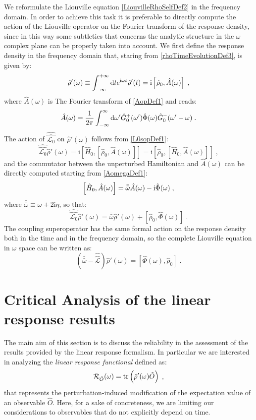 \documentclass[a4paper]{article}
\newcommand{\dd}{{\rm d}}
\newcommand{\bbomega}{{\bar{\bar\omega}}}
\newcommand{\ii}{\mathrm{i}}
\newcommand{\intover}[1]{\int_{-\infty}^{+\infty} \dd {#1}}
\newcommand{\be}{\begin{equation}}
\newcommand{\ee}{\end{equation}}
\newcommand{\nn}{\notag}
\newcommand{\lb}{\label}
\newcommand{\op}[1]{\hat {#1}}
\newcommand{\sop}[1]{\op{\op {#1}}}
\newcommand{\commutator}[2]{\left[ {#1} , {#2} \right]}
\newcommand{\trace}[1]{\mathrm{tr}\left(#1\right)}
\newcommand{\dmnot}{\op{\rho}_0}
\newcommand{\dm}{\op{\rho}}
\newcommand{\hnot}{\op{H}_0}
\newcommand{\Liouv}{\sop{\mathcal L}}
\newcommand{\Liouvnot}{\sop{\mathcal L_0}}
\begin{document}
We reformulate the Liouville equation \eqref{LiouvilleRhoSelfDef2} in the frequency domain. In order to achieve this task it is
preferable to directly compute the action of the Liouville operator on the Fourier transform of the response density, since in this
way some subtleties that concerns the analytic structure in the $\omega$ complex plane can be properly taken into account.
We first define the response density in the frequency domain that, staring from \eqref{rhoTimeEvolutionDef3}, is given by:
\be\lb{rhoPrimeOmegaDef1}
\dm'(\omega) \equiv \intover{t} e^{\ii \omega t} \dm'(t)
= \ii \commutator{\dmnot}{\op A(\omega)} \;,
\ee
where $\op A(\omega)$ is The Fourier transform of \eqref{AopDef1} and reads:
\be \lb{AomegaDef1}
\op A(\omega) = \frac{1}{2\pi} \int_{-\infty}^\infty  \dd \omega'
\op G_0^+(\omega') \op \Phi(\omega) \op G_0^-(\omega'-\omega)\;.
\ee
The action of $\Liouvnot$ on $\dm'(\omega)$ follows from \eqref{L0sopDef1}:
\be\lb{LiouvillianRhopomegaDef1}
\Liouvnot \dm'(\omega) = \ii \commutator{\hnot}{\commutator{\dmnot}{\op A(\omega)}} = 
\ii \commutator{\dmnot}{\commutator{\hnot}{\op A(\omega)}} \;,
\ee
and the commutator between the unperturbed Hamiltonian and $\op A(\omega)$ can be directly computed starting from \eqref{AomegaDef1}: 
\be
\commutator{\hnot }{\op A(\omega)} = \bbomega \op A(\omega) - \ii \op \Phi(\omega)\;, \nn
\ee
where $\bbomega \equiv \omega + 2\ii\eta$, so that:
\be\lb{LiouvillianRhopomegaDef2}
\Liouvnot \dm'(\omega) =  \bbomega\dm'(\omega) + \commutator{\dmnot}{\op\Phi(\omega)}\;.
\ee
The coupling superoperator has the same formal action on the response density both in the time and in the frequency domain, so the complete
Liouville equation in $\omega$ space can be written as:
\be\lb{LiouvillianRhopomegaDef3}
\left(\bbomega - \Liouv\right) \dm'(\omega) =  \commutator{\op\Phi(\omega)}{\dmnot}\;.
\ee

\section{Critical Analysis of the linear response results}

The main aim of this section is to discuss the reliability in the assessment of the results provided by the linear response formalism. In particular we are interested in 
analyzing the \emph{linear response functional} defined as:
\be\lb{LinearResponseFunctDef1}
{\cal R}_{\op O}(\omega) = \trace{\dm'(\omega)\op O} \;,
\ee
that represents the perturbation-induced modification of the expectation value of an observable $\op O$. Here, for a sake of concreteness, we are limiting our considerations 
to observables that do not explicitly depend on time. 
\end{document}
